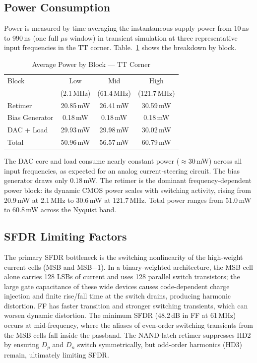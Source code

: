 \documentclass[lettersize,journal]{IEEEtran}
\begin{document}
\subsection{Power Consumption}

Power is measured by time-averaging the instantaneous supply power from
10\,ns to 990\,ns (one full $\mu$s window) in transient simulation at three
representative input frequencies in the TT corner.
Table.~\ref{tab:power} shows the breakdown by block.

\begin{table}[h]
  \renewcommand{\arraystretch}{1.2}
  \caption{Average Power by Block — TT Corner}
  \label{tab:power}
  \centering
  \begin{tabular}{lccc}
    \toprule
    Block & Low & Mid & High \\
                   & (2.1\,MHz)   & (61.4\,MHz)  & (121.7\,MHz)  \\
    \midrule
    Retimer        & 20.85\,mW & 26.41\,mW & 30.59\,mW \\
    Bias Generator &  0.18\,mW &  0.18\,mW &  0.18\,mW \\
    DAC + Load     & 29.93\,mW & 29.98\,mW & 30.02\,mW \\
    \midrule
    Total & 50.96\,mW & 56.57\,mW & 60.79\,mW \\
    \bottomrule
  \end{tabular}
\end{table}

The DAC core and load consume nearly constant power ($\approx$30\,mW) across
all input frequencies, as expected for an analog current-steering circuit.
The bias generator draws only 0.18\,mW.
The retimer is the dominant frequency-dependent power block: its dynamic
CMOS power scales with switching activity, rising from 20.9\,mW at 2.1\,MHz
to 30.6\,mW at 121.7\,MHz.
Total power ranges from 51.0\,mW to 60.8\,mW across the Nyquist band.

\subsection{SFDR Limiting Factors}

The primary SFDR bottleneck is the switching nonlinearity of the high-weight
current cells (MSB and MSB$-$1).
In a binary-weighted architecture, the MSB cell alone carries 128 LSBs of current
and uses 128 parallel switch transistors; the large gate capacitance of these
wide devices causes code-dependent charge injection and finite rise/fall time
at the switch drains, producing harmonic distortion.
FF has faster transition and stronger switching transients, which can worsen dynamic distortion. 
The minimum SFDR (48.2\,dB in FF at 61\,MHz) occurs at mid-frequency, where
the aliases of even-order switching transients from the MSB cells fall inside
the passband.
The NAND-latch retimer suppresses HD2 by ensuring $D_p$ and $D_n$ switch
symmetrically, but odd-order harmonics (HD3) remain, ultimately limiting SFDR.
\end{document}
